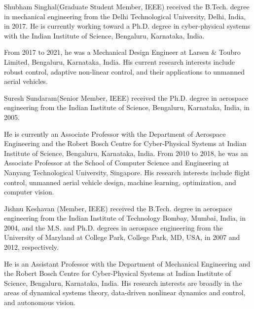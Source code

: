 \documentclass{IEEEtaes}
\begin{document}


\begin{IEEEbiography}{Shubham Singhal}{\space}(Graduate Student Member, IEEE) received the B.Tech. degree in mechanical engineering from the Delhi Technological University, Delhi, India, in 2017.  He is currently working toward a Ph.D. degree in cyber-physical systems with the Indian Institute of Science, Bengaluru, Karnataka, India.

From 2017 to 2021, he was a Mechanical Design Engineer at Larsen \& Toubro Limited, Bengaluru, Karnataka, India. His current research interests include robust control, adaptive non-linear control, and their applications to unmanned aerial vehicles.
\end{IEEEbiography}%

\begin{IEEEbiography}{Suresh Sundaram}(Senior Member, IEEE) received the Ph.D. degree in aerospace engineering from the Indian Institute of Science, Bengaluru, Karnataka, India, in 2005.

He is currently an Associate Professor with the Department of Aerospace Engineering and the Robert Bosch Centre for Cyber-Physical Systems at Indian Institute of Science, Bengaluru, Karnataka, India. From 2010 to 2018, he was an Associate Professor at the School of Computer Science and Engineering at Nanyang Technological University, Singapore. His research interests include flight control, unmanned aerial vehicle design, machine learning, optimization, and computer vision.
\end{IEEEbiography}

\begin{IEEEbiography}{Jishnu Keshavan} (Member, IEEE)  received the B.Tech. degree in aerospace engineering from the Indian Institute of Technology Bombay, Mumbai, India, in 2004, and the M.S. and Ph.D. degrees in aerospace engineering from the University of Maryland at College Park, College Park, MD, USA, in 2007 and 2012, respectively.

He is an Assistant Professor with the Department of Mechanical Engineering and the Robert Bosch Centre for Cyber-Physical Systems at Indian Institute of Science, Bengaluru, Karnataka, India. His research interests are broadly in the areas of dynamical systems theory, data-driven nonlinear dynamics and control, and autonomous vision.
\end{IEEEbiography}
\end{document}
